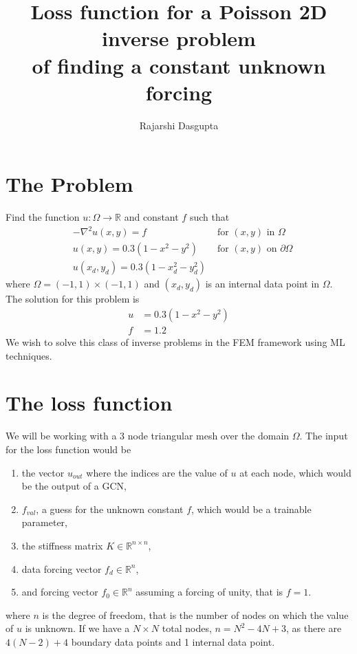 \documentclass{article}
\title{
	Loss function for a Poisson 2D inverse problem \\
	of finding a constant unknown forcing
	}
\author{Rajarshi Dasgupta}
\begin{document}
\maketitle

\section{The Problem}

Find the function $u: \Omega \rightarrow \mathbb{R}$
and constant $f$ such that
\begin{align*}
	& - \nabla^2 u(x,y) = f & \mbox{ for } (x,y) \mbox{ in } \Omega \\
	& u(x,y) = 0.3(1 - x^2 - y^2) & \mbox{ for } (x,y) \mbox{ on } \partial \Omega \\
	& u(x_d,y_d) = 0.3(1 - x_d^2 - y_d^2)
\end{align*}
where $\Omega = (-1,1) \times (-1,1)$
and $(x_d,y_d)$ is an internal data point in $\Omega$.
The solution for this problem is
\begin{align*}
	u & = 0.3(1 - x^2 - y^2) \\
	f &= 1.2
\end{align*}
We wish to solve this class of inverse problems
in the FEM framework using ML techniques.

\section{The loss function}

We will be working with a 3 node triangular mesh
over the domain $\Omega$.
The input for the loss function would be
\begin{enumerate}
	\item the vector $u_{\mathit{out}}$
		where the indices are the value of $u$ at each node,
		which would be the output of a GCN,
	\item $f_{\mathit{val}}$, a guess for the unknown constant $f$,
		which would be a trainable parameter,
	\item the stiffness matrix $K \in \mathbb{R}^{n \times n}$,
	\item data forcing vector $f_d \in \mathbb{R}^n$,
	\item and forcing vector $f_0 \in \mathbb{R}^n$
		assuming a forcing of unity,
		that is $f=1$.
\end{enumerate}
where $n$ is the degree of freedom,
that is the number of nodes
on which the value of $u$ is unknown.
If we have a $N \times N$ total nodes,
$n = N^2 - 4N + 3$,
as there are $4(N-2) + 4$ boundary data points
and 1 internal data point.
\end{document}
